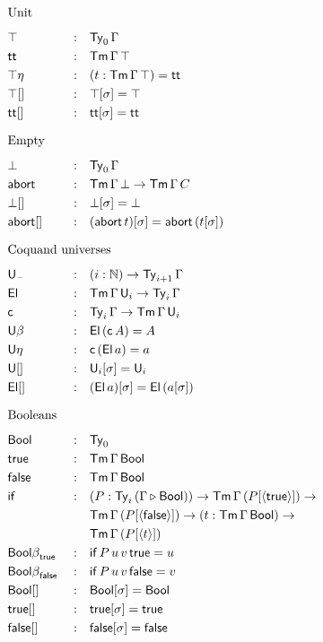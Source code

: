 \documentclass{article}
\begin{document}
\begin{multicols}{3}
\begin{alignat*}{5}
  & \heading{Unit} \\
  & \top && : && \Ty_0\,\Gamma \\
  & \tt && : && \Tm\,\Gamma\,\top \\
  & {\top\eta} && : && (t:\Tm\,\Gamma\,\top) = \tt \\
  & {\top[]} && : && \top[\sigma] = \top \\
  & {\tt[]} && : && \tt[\sigma] = \tt \\
  & \heading{Empty} \\
  & \bot && : && \Ty_0\,\Gamma \\
  & \abort && : && \Tm\,\Gamma\,\bot\ra\Tm\,\Gamma\,C \\
  & {\bot[]} && : && \bot[\sigma] = \bot \\
  & {\abort[]} && : && (\abort\,t)[\sigma] = \abort\,(t[\sigma]) \\
  & \heading{Coquand universes} \\
  & \U_{\blank} && : && (i:\N)\ra\Ty_{i+1}\,\Gamma \\
  & \El && : && \Tm\,\Gamma\,\U_i \ra \Ty_i\,\Gamma \\
  & \c && : && \Ty_i\,\Gamma\ra\Tm\,\Gamma\,\U_i \\
  & {\U\beta} && : && \El\,(\c\,A) = A \\
  & {\U\eta} && : && \c\,(\El\,a) = a \\
  & {\U[]} && : && \U_i[\sigma] = \U_i \\
  & {\El[]} && : && (\El\,a)[\sigma] = \El\,(a[\sigma]) \\
  & \heading{Booleans} \\
  & \Bool && : && \Ty_0 \\
  & \true && : && \Tm\,\Gamma\,\Bool \\
  & \false && : && \Tm\,\Gamma\,\Bool \\
  & \IF && : && (P:\Ty_i\,(\Gamma\ext\Bool))\ra\Tm\,\Gamma\,(P[\lb\true\rb])\ra \\
  & && && \Tm\,\Gamma\,(P[\lb\false\rb])\ra(t:\Tm\,\Gamma\,\Bool)\ra \\
  & && && \Tm\,\Gamma\,(P[\lb t\rb]) \\
  & {\Bool\beta}_\true && : && \IF\,P\,u\,v\,\true = u \\
  & {\Bool\beta}_\false && : && \IF\,P\,u\,v\,\false = v \\
  & {\Bool[]} && : && \Bool[\sigma] = \Bool \\
  & {\true[]} && : && \true[\sigma] = \true \\
  & {\false[]} && : && \false[\sigma] = \false \\

\end{alignat*}
\end{multicols}
\end{document}
